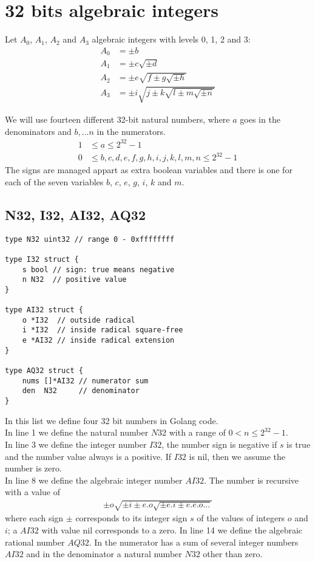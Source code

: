 \documentclass{article}
\begin{document}
\section{32 bits algebraic integers}

Let $A_0$, $A_1$, $A_2$ and $A_3$ algebraic integers with levels 0, 1, 2 and 3:
\begin{align}
A_0 &= \pm b\\
A_1 &= \pm c\sqrt{\pm d}\\
A_2 &= \pm e\sqrt{f \pm g\sqrt{\pm h}}\\
A_3 &= \pm i\sqrt{j \pm k\sqrt{l \pm m\sqrt{\pm n}}}
\end{align}

We will use fourteen different 32-bit natural numbers, where $a$ goes in the denominators and $b,...n$ 
in the numerators.
\begin{align}
1 &\leq a       \leq 2^{32} - 1\\
0 &\leq b,c,d,e,f,g,h,i,j,k,l,m,n \leq 2^{32} - 1
\end{align}
The signs are managed appart as extra boolean variables and there is one for each of the seven variables
$b$, $c$, $e$, $g$, $i$, $k$ and $m$.

\subsection{N32, I32, AI32, AQ32}

\setlength{\columnsep}{30pt}
\begin{multicols}{2}
\begin{lstlisting}
type N32 uint32 // range 0 - 0xffffffff

type I32 struct {
	s bool // sign: true means negative
	n N32  // positive value
}

type AI32 struct {
	o *I32  // outside radical
	i *I32  // inside radical square-free
	e *AI32 // inside radical extension
}

type AQ32 struct {
	nums []*AI32 // numerator sum
	den  N32     // denominator
}
\end{lstlisting}
In this list we define four 32 bit numbers in Golang code.\\
In line 1 we define the natural number $N32$ with a range of $0 < n \leq 2^{32} - 1$.\\
In line 3 we define the integer number $I32$, the number sign is negative if $s$ is true 
and the number value always is a positive. If $I32$ is nil, then we assume the number
is zero.\\
In line 8 we define the algebraic integer number $AI32$. The number is recursive with a value of
\begin{align}
\pm o\sqrt{\pm i \pm e.o\sqrt{\pm e.i \pm e.e.o ... }}
\end{align}
where each sign $\pm$ corresponds to its integer sign $s$ of the values of integers $o$ and $i$;
a $AI32$ with value nil corresponds to a zero.
In line 14 we define the algebraic rational number $AQ32$. In the numerator has a sum of several
integer numbers $AI32$ and in the denominator a natural number $N32$ other than zero.
\end{multicols}
\end{document}
